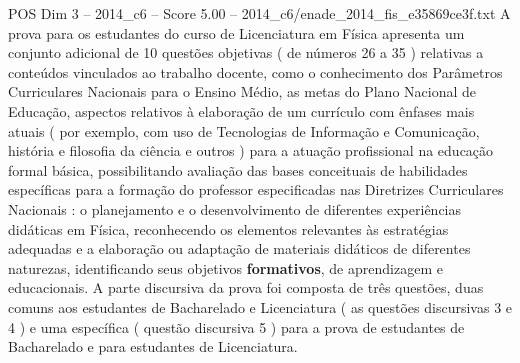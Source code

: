 \begin{textsample}{POS Dim 3 – 2014\_c6 – Score 5.00 – 2014\_c6/enade\_2014\_fis\_e35869ce3f.txt}
A prova para os estudantes do curso de Licenciatura em Física apresenta um conjunto adicional de 10 questões objetivas ( de números 26 a 35 ) relativas a conteúdos vinculados ao trabalho docente, como o conhecimento dos Parâmetros Curriculares Nacionais para o Ensino Médio, as metas do Plano Nacional de Educação, aspectos relativos à elaboração de um currículo com ênfases mais atuais ( por exemplo, com uso de Tecnologias de Informação e Comunicação, história e filosofia da ciência e outros ) para a atuação profissional na educação formal básica, possibilitando avaliação das bases conceituais de habilidades específicas para a formação do professor especificadas nas Diretrizes Curriculares Nacionais : o planejamento e o desenvolvimento de diferentes experiências didáticas em Física, reconhecendo os elementos relevantes às estratégias adequadas e a elaboração ou adaptação de materiais didáticos de diferentes naturezas, identificando seus objetivos \textbf{formativos}, de aprendizagem e educacionais.
A parte discursiva da prova foi composta de três questões, duas comuns aos estudantes de Bacharelado e Licenciatura ( as questões discursivas 3 e 4 ) e uma específica ( questão discursiva 5 ) para a prova de estudantes de Bacharelado e para estudantes de Licenciatura.

\end{textsample}
